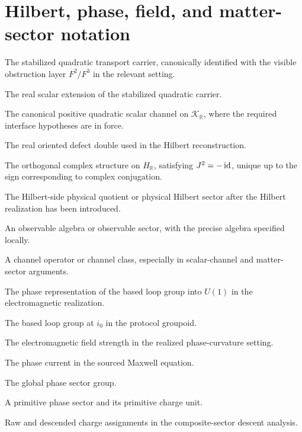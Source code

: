 \section*{Hilbert, phase, field, and matter-sector notation}
\begin{description}[leftmargin=3.6cm,style=nextline]
\item[\(\mathcal K\)]
The stabilized quadratic transport carrier, canonically identified with
the visible obstruction layer \(F^2/F^3\) in the relevant setting.
\item[\(\mathcal K_{\mathbb R}\)]
The real scalar extension of the stabilized quadratic carrier.
\item[\(Q\)]
The canonical positive quadratic scalar channel on
\(\mathcal K_{\mathbb R}\), where the required interface hypotheses are
in force.
\item[\(H_{\mathbb R}\)]
The real oriented defect double used in the Hilbert reconstruction.
\item[\(J\)]
The orthogonal complex structure on \(H_{\mathbb R}\), satisfying
\(J^2=-\operatorname{id}\), unique up to the sign corresponding to complex
conjugation.
\item[\(\PhysH\)]
The Hilbert-side physical quotient or physical Hilbert sector after the
Hilbert realization has been introduced.
\item[\(\Obs\)]
An observable algebra or observable sector, with the precise algebra
specified locally.
\item[\(\Chan\)]
A channel operator or channel class, especially in scalar-channel and
matter-sector arguments.
\item[\(\rho_{\mathrm{ph}}\)]
The phase representation of the based loop group into \(U(1)\) in the
electromagnetic realization.
\item[\(\Omega_{i_0}(\mathcal G(\mathcal I))\)]
The based loop group at \(i_0\) in the protocol groupoid.
\item[\(F\)]
The electromagnetic field strength in the realized phase-curvature
setting.
\item[\(J_{\mathrm{ph}}\)]
The phase current in the sourced Maxwell equation.
\item[\(\mathsf P_\infty\)]
The global phase sector group.
\item[\(\mathfrak p_0\), \(q_0\)]
A primitive phase sector and its primitive charge unit.
\item[\(q_{\mathrm{raw}}\), \(q_{\mathrm{obs}}\)]
Raw and descended charge assignments in the composite-sector descent
analysis.
\item[\(G_{\mathrm{int}}\)]

\end{description}
